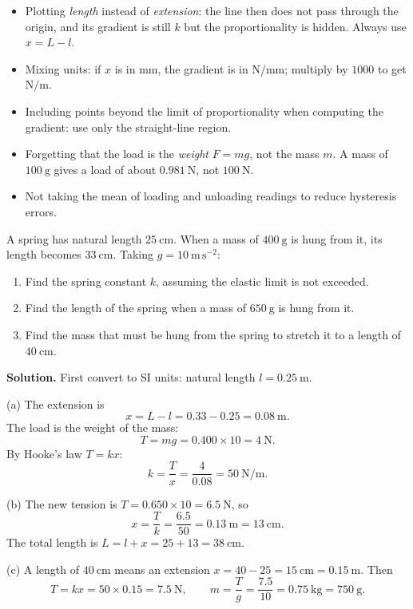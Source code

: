 \documentclass[11pt]{article}
\newcounter{popsec}
\newcounter{popsub}
\newcommand{\courssub}[1]{%
  \stepcounter{popsub}%
  \par\vspace{9pt}\noindent{\popxbold\fontsize{11.5}{13}\selectfont\color{popink}{\color{poporange}\thepopsec.\thepopsub}\hspace{6pt}#1}\par\nopagebreak\vspace{4pt}
}
\begin{document}
\begin{attention}
\begin{itemize}
\item Plotting \emph{length} instead of \emph{extension}: the line then does not pass through the origin, and its gradient is still $k$ but the proportionality is hidden. Always use $x = L - l$.
\item Mixing units: if $x$ is in mm, the gradient is in N/mm; multiply by $1000$ to get $\mathrm{N/m}$.
\item Including points beyond the limit of proportionality when computing the gradient: use only the straight-line region.
\item Forgetting that the load is the \emph{weight} $F = mg$, not the mass $m$. A mass of $100\ \mathrm{g}$ gives a load of about $0.981\ \mathrm{N}$, not $100\ \mathrm{N}$.
\item Not taking the mean of loading and unloading readings to reduce hysteresis errors.
\end{itemize}
\end{attention}

\courssub{Worked Examples}

\begin{exoresolu}
A spring has natural length $25\ \mathrm{cm}$. When a mass of $400\ \mathrm{g}$ is hung from it, its length becomes $33\ \mathrm{cm}$. Taking $g = 10\ \mathrm{m\,s^{-2}}$:
\begin{enumerate}
\item[(a)] Find the spring constant $k$, assuming the elastic limit is not exceeded.
\item[(b)] Find the length of the spring when a mass of $650\ \mathrm{g}$ is hung from it.
\item[(c)] Find the mass that must be hung from the spring to stretch it to a length of $40\ \mathrm{cm}$.
\end{enumerate}
\tcblower
\textbf{Solution.} First convert to SI units: natural length $l = 0.25\ \mathrm{m}$.

(a) The extension is
\[ x = L - l = 0.33 - 0.25 = 0.08\ \mathrm{m}. \]
The load is the weight of the mass:
\[ T = mg = 0.400 \times 10 = 4\ \mathrm{N}. \]
By Hooke's law $T = kx$:
\[ k = \frac{T}{x} = \frac{4}{0.08} = 50\ \mathrm{N/m}. \]

(b) The new tension is $T = 0.650 \times 10 = 6.5\ \mathrm{N}$, so
\[ x = \frac{T}{k} = \frac{6.5}{50} = 0.13\ \mathrm{m} = 13\ \mathrm{cm}. \]
The total length is $L = l + x = 25 + 13 = 38\ \mathrm{cm}$.

(c) A length of $40\ \mathrm{cm}$ means an extension $x = 40 - 25 = 15\ \mathrm{cm} = 0.15\ \mathrm{m}$. Then
\[ T = kx = 50 \times 0.15 = 7.5\ \mathrm{N}, \qquad m = \frac{T}{g} = \frac{7.5}{10} = 0.75\ \mathrm{kg} = 750\ \mathrm{g}. \]
\end{exoresolu}
\end{document}
